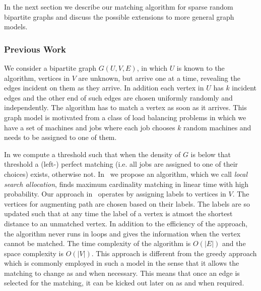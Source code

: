 \documentclass{scrartcl}
\begin{document}
In the next section we describe our matching algorithm for sparse random bipartite graphs and discuss the possible extensions to more general graph models. 


\subsubsection{Previous Work}
We consider a bipartite graph $G(U,V,E)$, in which $U$ is known to the algorithm, vertices in $V$ are
unknown, but arrive one at a time, revealing the edges incident on
them as they arrive. In addition each vertex in $U$ has $k$ incident edges and the other end of such edges are chosen uniformly randomly and independently. The algorithm has to match a vertex
as soon as it arrives. This graph model is motivated from a class of load balancing problems in which we have a set of machines and jobs where each job chooses $k$ random machines and needs to be assigned to one of them.

In \cite{kCores} we compute a threshold such that when the density of $G$ is below that threshold a (left-) perfect matching (i.e. all jobs are assigned to one of their choices) exists, otherwise not.
%
In~\cite{ballsbins} we propose an algorithm, which we call \emph{local search allocation}, finds maximum cardinality matching in linear time with high probability.
Our approach in~\cite{ballsbins} operates by assigning labels to vertices in $V$. The vertices for augmenting path are chosen based on their labels. The labels are so updated such that at any time the label of a vertex is atmost the shortest distance to an unmatched vertex. In addition to the efficiency of the approach, the algorithm never runs in loops and gives the information when the vertex cannot be matched. The time complexity of the algorithm is $O(|E|)$ and the space complexity is $O(|V|)$. This approach is different from the greedy approach which is commonly employed in such a model in the sense that it allows the matching to change as and when necessary. This means that once an edge is selected for the matching, it can be kicked out later on as and when required.
\end{document}
